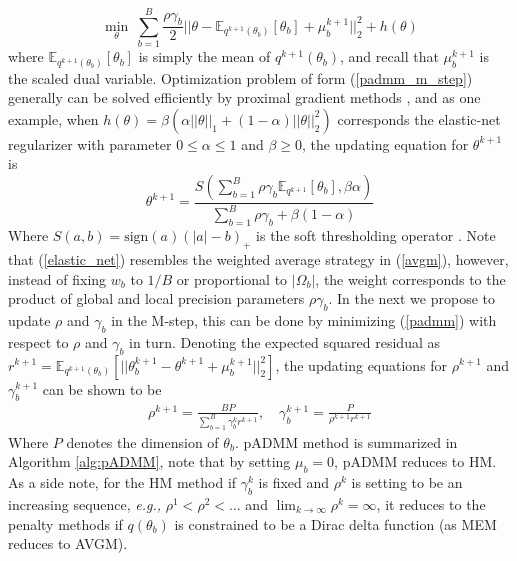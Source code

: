 \documentclass{article}
\newcommand{\eg}[0]{\emph{e.g., }}
\newcommand{\1}[0]{\ensuremath{\boldsymbol{1}}\xspace}
\begin{document}
\begin{equation}\label{padmm_m_step}
\textstyle \min_{\theta} ~\sum_{b=1}^B\frac{\rho\gamma_b}{2}||\theta-\mathbb{E}_{q^{k+1}(\theta_b)}[\theta_b] + \mu^{k+1}_b||^2_2 + h(\theta)
\end{equation}
where $\mathbb{E}_{q^{k+1}(\theta_b)}[\theta_b]$ is simply the mean of $q^{k+1}(\theta_b)$, and recall that $\mu^{k+1}_b$ is the scaled dual variable. Optimization problem of form (\ref{padmm_m_step}) generally can be solved efficiently by proximal gradient methods \cite{Parikh13}, and as one example, when $h(\theta) = \beta(\alpha||\theta||_1 + (1-\alpha)||\theta||^2_2)$ corresponds the elastic-net regularizer with parameter $0\le\alpha\le 1$ and $\beta\ge0$, the updating equation for $\theta^{k+1}$ is
\begin{equation}\label{elastic_net}
 \theta^{k+1} = \frac{S(\textstyle\sum_{b=1}^B\rho\gamma_b\mathbb{E}_{q^{k+1}}[\theta_b], \beta\alpha )}{\sum_{b=1}^B\rho\gamma_b + \beta(1-\alpha)}
\end{equation}
Where $S(a, b) = \mbox{sign}(a)(|a|-b)_{+}$ is the soft thresholding operator \cite{Friedman2010}. Note that (\ref{elastic_net}) resembles the weighted average strategy in (\ref{avgm}), however, instead of fixing $w_b$ to $1/B$ or proportional to $|\Omega_b|$, the weight corresponds to the product of global and local precision parameters $\rho\gamma_b$. In the next we propose to update $\rho$ and $\gamma_b$ in the M-step, this can be done by minimizing (\ref{padmm}) with respect to $\rho$ and $\gamma_b$ in turn. Denoting the expected squared residual as $r^{k+1} = \mathbb{E}_{q^{k+1}(\theta_b)}[||\theta_b^{k+1}-\theta^{k+1}+\mu_b^{k+1}||_2^2]$, the updating equations for $\rho^{k+1}$ and $\gamma_b^{k+1}$ can be shown to be
\begin{equation}\label{em_bayes}
\begin{gathered}
\textstyle \rho^{k+1} = \frac{BP}{\sum_{b=1}^B\gamma_b^kr^{k+1}}, \quad \gamma_b^{k+1} = \frac{P}{\rho^{k+1}r^{k+1}}
\end{gathered}
\end{equation}
Where $P$ denotes the dimension of $\theta_b$. pADMM method is summarized in Algorithm \ref{alg:pADMM}, note that  by setting $\mu_b = 0$, pADMM reduces to HM. As a side note, for the HM method if $\gamma_b^k$ is fixed and $\rho^k$ is setting to be an increasing sequence, \eg $\rho^1 < \rho^2 < \ldots$ and $\lim_{k\to\infty}\rho^{k} = \infty$, it reduces to the penalty methods \cite{Bertsekas1989, Bertsekas1996} if $q(\theta_b)$ is constrained to be a Dirac delta function (as MEM reduces to AVGM).
\end{document}
